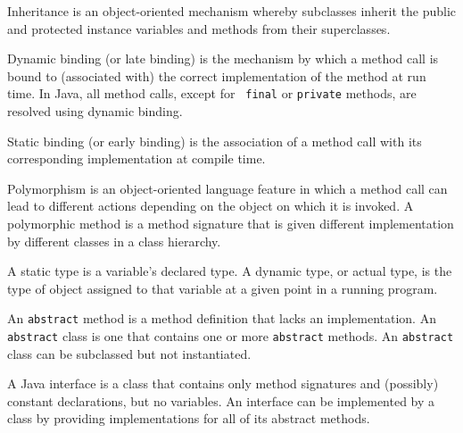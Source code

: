 \label{summaryof-important-points}
\begin{SMBL}
\item Inheritance is an object-oriented mechanism whereby subclasses inherit
the public and protected instance variables and methods from their superclasses.

\item Dynamic binding (or late binding) is the mechanism by which a
method call is bound to (associated with) the correct implementation
of the method at run time. In Java, all method calls, except for {\tt
final} or {\tt private} methods, are resolved using dynamic binding.

\item Static binding (or early binding) is the association of a method
call with its corresponding implementation at compile time.

\item Polymorphism is an object-oriented language feature in which a
method call can lead to different actions depending on the object on
which it is invoked.  A polymorphic method is a method signature that
is given different implementation by different classes in a class
hierarchy.

\item A static type is a variable's declared type. A dynamic type, or actual type,
is the type of object assigned to that variable at a given point in a running program.

\item An {\tt abstract} method is a method definition that lacks an
implementation. An {\tt abstract} class is one that contains one or
more {\tt abstract} methods.  An {\tt abstract} class can be
subclassed but not instantiated.

\item A Java interface is a class that contains only method signatures and
(possibly) constant declarations, but no variables.  An interface can be
implemented by a class by providing implementations for all of its abstract
methods.

\end{SMBL}


